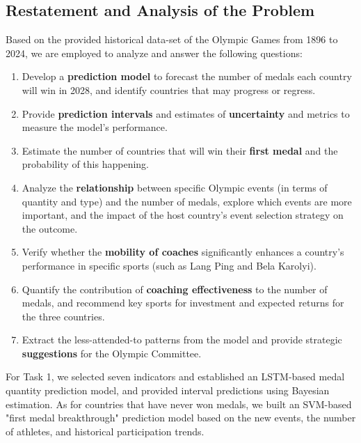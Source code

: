 \documentclass{mcmthesis}
\begin{document}
\subsection{Restatement and Analysis of the Problem}
Based on the provided historical data-set of the Olympic Games from 1896 to 2024, we are employed to analyze and answer the following questions:
\begin{enumerate}
	\item 
	Develop a \textbf{prediction model} to forecast the number of medals each country will win in 2028, and identify countries that may progress or regress. 
	\item 
	Provide \textbf{prediction intervals} and estimates of \textbf{uncertainty} and metrics to measure the model's performance.
	\item 
	Estimate the number of countries that will win their \textbf{first medal} and the probability of this happening.
	\item 
	Analyze the \textbf{relationship} between specific Olympic events (in terms of quantity and type) and the number of medals, explore which events are more important, and the impact of the host country's event selection strategy on the outcome.
	\item 
	Verify whether the \textbf{mobility of coaches} significantly enhances a country's performance in specific sports (such as Lang Ping and Bela Karolyi).
	\item 
	Quantify the contribution of\textbf{ coaching effectiveness} to the number of medals, and recommend key sports for investment and expected returns for the three countries.
	\item 
	Extract the less-attended-to patterns from the model and provide strategic \textbf{suggestions} for the Olympic Committee.
\end{enumerate}

For Task 1, we selected seven indicators and established an LSTM-based medal quantity prediction model, and provided interval predictions using Bayesian estimation. As for countries that have never won medals, we built an SVM-based "first medal breakthrough" prediction model based on the new events, the number of athletes, and historical participation trends.


\end{document}
